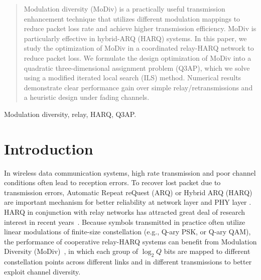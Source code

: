\documentclass[journal]{IEEEtran}
\begin{document}
\begin{abstract}
Modulation diversity (MoDiv) is a practically useful transmission enhancement
technique that utilizes different modulation mappings to reduce packet loss rate
and achieve higher transmission efficiency. MoDiv is particularly effective in
hybrid-ARQ (HARQ) systems. In this paper, we study the optimization of MoDiv in
a coordinated relay-HARQ network to reduce packet loss.
We formulate the design optimization of MoDiv into a quadratic three-dimensional
assignment problem (Q3AP), which we solve using a modified iterated local search
(ILS) method. Numerical results demonstrate clear performance gain over simple
relay/retransmissions and a heuristic design under fading channels.
\end{abstract}

\begin{IEEEkeywords}
    Modulation diversity, relay, HARQ, Q3AP.
\end{IEEEkeywords}

%
\IEEEpeerreviewmaketitle


\section{Introduction}
In wireless data communication systems, high rate transmission and poor channel
conditions often lead to reception errors. To recover lost packet due to
transmission errors, Automatic Repeat reQuest (ARQ) or Hybrid ARQ (HARQ) are
important mechanism for better reliability at network layer \cite{TS36.331} and
PHY layer \cite{TS36.213}. HARQ in conjunction with relay networks has attracted
great deal of research interest in recent years~\cite{ngo2014hybrid}. Because
symbols transmitted in practice often utilize linear modulations of finite-size
constellation (e.g., Q-ary PSK, or Q-ary QAM), the performance of cooperative
relay-HARQ systems can benefit from Modulation Diversity
(MoDiv)~\cite{benelli1992new}, in which each group of $\log_2 Q$ bits are mapped
to different constellation points across different links and in different
transmissions to better exploit channel diversity.
\end{document}
